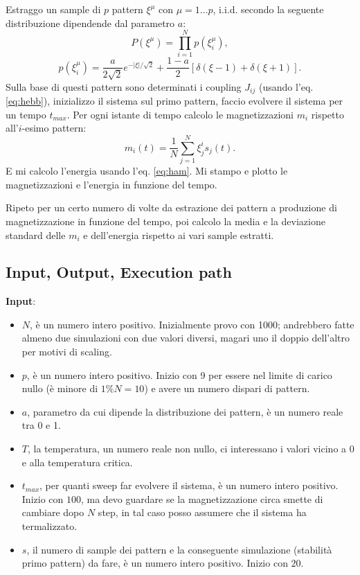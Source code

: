 \documentclass[a4paper,10pt]{article}
\begin{document}
Estraggo un sample di $p$ pattern $\xi^\mu$ con $\mu=1\ldots p$, i.i.d. secondo la seguente distribuzione dipendende dal parametro $a$:
\[
 P(\xi^\mu)=\prod_{i=1}^N p(\xi_i^\mu),
\]
\[
 p(\xi_i^\mu) = \frac{a}{2\sqrt{2}} e^{-|\xi|/\sqrt{2}} + \frac{1-a}{2} \left[ \delta(\xi-1) + \delta(\xi+1) \right].
\]
Sulla base di questi pattern sono determinati i coupling $J_{ij}$ (usando l'eq. \ref{eq:hebb}), inizializzo il sistema sul primo pattern, faccio evolvere il sistema per un tempo $t_{max}$. Per ogni istante di tempo calcolo le magnetizzazioni $m_i$ rispetto all'$i$-esimo pattern:
\[
 m_i(t)=\frac{1}{N}\sum_{j=1}^N \xi_j^i s_j(t) .
\]
E mi calcolo l'energia usando l'eq. \ref{eq:ham}.
Mi stampo e plotto le magnetizzazioni e l'energia in funzione del tempo.

Ripeto per un certo numero di volte da estrazione dei pattern a produzione di magnetizzazione in funzione del tempo, poi calcolo la media e la deviazione standard delle $m_i$ e dell'energia rispetto ai vari sample estratti.

\subsection{Input, Output, Execution path}

\textbf{Input}: \begin{itemize}
\item $N$, è un numero intero positivo. Inizialmente provo con 1000; andrebbero fatte almeno due simulazioni con due valori diversi, magari uno il doppio dell'altro per motivi di scaling.
\item $p$, è un numero intero positivo. Inizio con 9 per essere nel limite di carico nullo (è minore di $1\%N=10$) e avere un numero dispari di pattern.
\item $a$, parametro da cui dipende la distribuzione dei pattern, è un numero reale tra 0 e 1.
\item $T$, la temperatura, un numero reale non nullo, ci interessano i valori vicino a 0 e alla temperatura critica.
\item $t_{max}$, per quanti sweep far evolvere il sistema, è un numero intero positivo. Inizio con $100$, ma devo guardare se la magnetizzazione circa smette di cambiare dopo $N$ step, in tal caso posso assumere che il sistema ha termalizzato.
\item $s$, il numero di sample dei pattern e la conseguente simulazione (stabilità primo pattern) da fare, è un numero intero positivo. Inizio con $20$.                                                                                                                                                                                                                                             \end{itemize}
\end{document}
